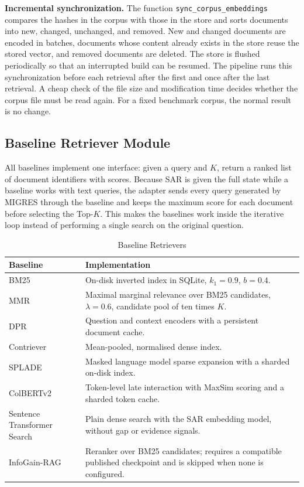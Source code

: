 \documentclass[12pt,a4paper]{report}
\begin{document}
\textbf{Incremental synchronization.} The function \texttt{sync\_corpus\_embeddings} compares the hashes in the corpus with those in the store and sorts documents into new, changed, unchanged, and removed. New and changed documents are encoded in batches, documents whose content already exists in the store reuse the stored vector, and removed documents are deleted. The store is flushed periodically so that an interrupted build can be resumed. The pipeline runs this synchronization before each retrieval after the first and once after the last retrieval. A cheap check of the file size and modification time decides whether the corpus file must be read again. For a fixed benchmark corpus, the normal result is no change.

\subsection{Baseline Retriever Module}

All baselines implement one interface: given a query and $K$, return a ranked list of document identifiers with scores. Because SAR is given the full state while a baseline works with text queries, the adapter sends every query generated by MIGRES through the baseline and keeps the maximum score for each document before selecting the Top-$K$. This makes the baselines work inside the iterative loop instead of performing a single search on the original question.

\begin{table}[H]
\centering
\caption{Baseline Retrievers}
\label{tab:impl-baselines}
\renewcommand{\arraystretch}{1.2}
\begin{tabular}{|p{1.55in}|p{4.5in}|}
\hline
\textbf{Baseline} & \textbf{Implementation} \\ \hline
BM25 \cite{robertson2009bm25} & On-disk inverted index in SQLite, $k_1=0.9$, $b=0.4$. \\ \hline
MMR \cite{carbonell1998mmr} & Maximal marginal relevance over BM25 candidates, $\lambda=0.6$, candidate pool of ten times $K$. \\ \hline
DPR \cite{karpukhin2020dpr} & Question and context encoders with a persistent document cache. \\ \hline
Contriever \cite{izacard2022contriever} & Mean-pooled, normalised dense index. \\ \hline
SPLADE \cite{formal2021splade} & Masked language model sparse expansion with a sharded on-disk index. \\ \hline
ColBERTv2 \cite{santhanam2022colbertv2} & Token-level late interaction with MaxSim scoring and a sharded token cache. \\ \hline
Sentence Transformer Search & Plain dense search with the SAR embedding model, without gap or evidence signals. \\ \hline
InfoGain-RAG \cite{wang2025infogain} & Reranker over BM25 candidates; requires a compatible published checkpoint and is skipped when none is configured. \\ \hline
\end{tabular}
\end{table}
\end{document}
